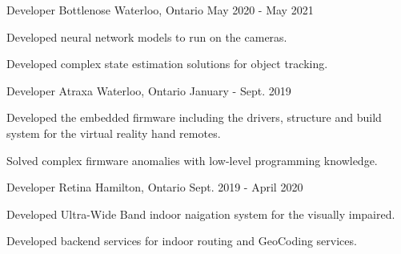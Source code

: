 
\begin{cventries}

  \cventry
    {Developer} %
    {Bottlenose} %
    {Waterloo, Ontario} %
    {May 2020 - May 2021} %
    {
      \begin{cvitems} %
        \item {Developed neural network models to run on the cameras.}
        \item {Developed complex state estimation solutions for object tracking.}
      \end{cvitems}
    }

  \cventry
    {Developer} %
    {Atraxa} %
    {Waterloo, Ontario} %
    {January - Sept. 2019} %
    {
      \begin{cvitems} %
        \item {Developed the embedded firmware including the drivers, structure and build system for the virtual reality hand remotes.}
        \item {Solved complex firmware anomalies with low-level programming knowledge.}
      \end{cvitems}
    }

  \cventry
    {Developer} %
    {Retina} %
    {Hamilton, Ontario} %
    {Sept. 2019 - April 2020} %
    {
      \begin{cvitems} %
        \item {Developed Ultra-Wide Band indoor naigation system for the visually impaired.}
        \item {Developed backend services for indoor routing and GeoCoding services.}
      \end{cvitems}
    }


\end{cventries}
